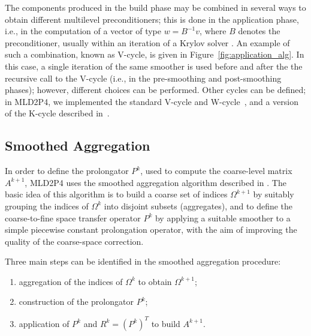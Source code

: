 The components produced in the build phase may be combined in several ways
to obtain different multilevel preconditioners;
this is  done in the application phase, i.e., in the computation of a vector
of type $w=B^{-1}v$, where $B$ denotes the preconditioner, usually within an iteration
of a Krylov solver \cite{Saad_book}. An example of such a combination, known as
V-cycle, is given in Figure~\ref{fig:application_alg}. In this case, a single iteration
of the same smoother is used before and after the the recursive call to the V-cycle (i.e.,
in the pre-smoothing and post-smoothing phases); however, different choices can be
performed. Other cycles can be defined; in MLD2P4, we implemented the standard V-cycle
and W-cycle~\cite{Briggs2000}, and a version of the K-cycle described
in~\cite{Notay2008}.  


\subsection{Smoothed Aggregation\label{sec:aggregation}}

In order to define the prolongator $P^k$, used to compute
the coarse-level matrix $A^{k+1}$, MLD2P4 uses the smoothed aggregation
algorithm described in \cite{BREZINA_VANEK,VANEK_MANDEL_BREZINA}.
The basic idea of this algorithm is to build a coarse set of indices
$\Omega^{k+1}$ by suitably grouping the indices of $\Omega^k$ into disjoint
subsets (aggregates), and to define the coarse-to-fine space transfer operator
$P^k$ by applying a suitable smoother to a simple piecewise constant
prolongation operator, with the aim of improving the quality of the coarse-space correction.

Three main steps can be identified in the smoothed aggregation procedure:
\begin{enumerate}
        \item aggregation of the indices of $\Omega^k$ to obtain $\Omega^{k+1}$;
        \item construction of the prolongator $P^k$;
        \item application of $P^k$ and $R^k=(P^k)^T$ to build $A^{k+1}$.
\end{enumerate}
 

